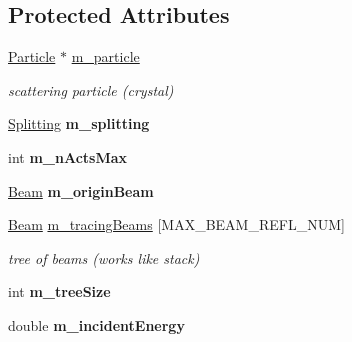 \subsection*{Protected Attributes}
\begin{DoxyCompactItemize}
\item 
\mbox{\label{class_scattering_aabab038d88c737bb87dd777175b9d541}} 
\mbox{\hyperlink{class_particle}{Particle}} $\ast$ \mbox{\hyperlink{class_scattering_aabab038d88c737bb87dd777175b9d541}{m\+\_\+particle}}
\begin{DoxyCompactList}\small\item\em scattering particle (crystal) \end{DoxyCompactList}\item 
\mbox{\label{class_scattering_aa4535b7a8928911c533fb4f6f026e75d}} 
\mbox{\hyperlink{class_splitting}{Splitting}} {\bfseries m\+\_\+splitting}
\item 
\mbox{\label{class_scattering_ad606af7cb9ada7951ab591d648fb9bbc}} 
int {\bfseries m\+\_\+n\+Acts\+Max}
\item 
\mbox{\label{class_scattering_a82f0c3297cbde80cd091a503428f2dc5}} 
\mbox{\hyperlink{class_beam}{Beam}} {\bfseries m\+\_\+origin\+Beam}
\item 
\mbox{\label{class_scattering_afc1ba0bd9bfe75cd35c389899d091ef7}} 
\mbox{\hyperlink{class_beam}{Beam}} \mbox{\hyperlink{class_scattering_afc1ba0bd9bfe75cd35c389899d091ef7}{m\+\_\+tracing\+Beams}} \mbox{[}M\+A\+X\+\_\+\+B\+E\+A\+M\+\_\+\+R\+E\+F\+L\+\_\+\+N\+UM\mbox{]}
\begin{DoxyCompactList}\small\item\em tree of beams (works like stack) \end{DoxyCompactList}\item 
\mbox{\label{class_scattering_adb62197742a6ee9e1b9c3e988a4a89ee}} 
int {\bfseries m\+\_\+tree\+Size}
\item 
\mbox{\label{class_scattering_a698c33191f5e87477b37b27e36bca0a2}} 
double {\bfseries m\+\_\+incident\+Energy}
\item 
\mbox{\label{class_scattering_a172f9184deb0e131762f21cd33a02788}} 

\end{DoxyCompactItemize}
